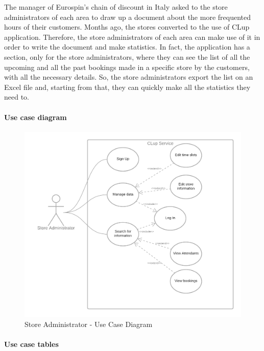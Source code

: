 \documentclass[table, 12pt]{article}
\begin{document}
The manager of Eurospin's chain of discount in Italy asked to the store administrators of each area to draw up a document about the more frequented hours of their customers. Months ago, the stores converted to the use of CLup application. Therefore, the store administrators of each area can make use of it in order to write the document and make statistics. In fact, the application has a section, only for the store administrators, where they can see the list of all the upcoming and all the past bookings made in a specific store by the customers, with all the necessary details. So, the store administrators export the list on an Excel file and, starting from that, they can quickly make all the statistics they need to.


\paragraph{Use case diagram}
\begin{figure}[H]
    \begin{center}
        \includegraphics[width=\textwidth]{assets/Use-Case-Diagrams/use_case_diagram_store_manager.png}
        \caption{Store Administrator - Use Case Diagram}
    \end{center}
\end{figure}

\newpage
\paragraph{Use case tables}
\end{document}

